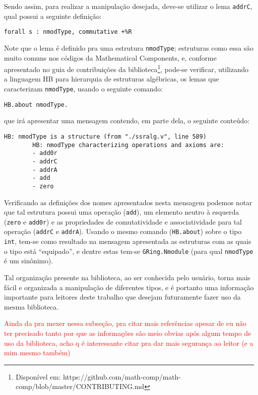 Sendo assim, para realizar a manipulação desejada, deve-se utilizar o lema \lstinline[language = coq]!addrC!, qual possui a seguinte definição: 
\begin{lstlisting}[language=coq]
        forall s : nmodType, commutative +%R
\end{lstlisting}
Note que o lema é definido pra uma estrutura \lstinline[language = coq]!nmodType!; estruturas como essa são muito comuns nos códigos da Mathematical Components, e, conforme apresentado no guia de contribuições da biblioteca\footnote{Disponível em: https://github.com/math-comp/math-comp/blob/master/CONTRIBUTING.md}, pode-se verificar, utilizando a linguagem HB \cite{cohen_et_al:LIPIcs.FSCD.2020.34} para hierarquia de estruturas algébricas, os lemas que caracterizam \lstinline[language = coq]!nmodType!, usando o seguinte comando: 
\begin{lstlisting}[language=coq]
        HB.about nmodType.
\end{lstlisting}
que irá apresentar uma mensagem contendo, em parte dela, o seguinte conteúdo:
\begin{lstlisting}[language=coq-error]
        HB: nmodType is a structure (from "./ssralg.v", line 589)
        HB: nmodType characterizing operations and axioms are:
        - add0r
        - addrC
        - addrA
        - add
        - zero
\end{lstlisting}
Verificando as definições dos nomes apresentados nesta mensagem podemos notar que tal estrutura possui uma operação (\lstinline[language = coq]!add!), um elemento neutro à esquerda (\lstinline[language = coq]!zero! e \lstinline[language = coq]!add0r!) e as propriedades de comutatividade e associatividade para tal operação (\lstinline[language = coq]!addrC! e \lstinline[language = coq]!addrA!).
Usando o mesmo comando (\lstinline[language = coq]!HB.about!) sobre o tipo \lstinline[language = coq]!int!, tem-se como resultado na mensagem apresentada as estruturas com as quais o tipo está ``equipado'', e dentre estas tem-se \lstinline[language = coq]!GRing.Nmodule! (para qual \lstinline[language=coq]!nmodType! é um sinônimo). 

Tal organização presente na biblioteca, ao ser conhecida pelo usuário, torna mais fácil e organizada a manipulação de diferentes tipos, e é portanto uma informação importante para leitores deste trabalho que desejam futuramente fazer uso da mesma biblioteca. 

\textcolor{red}{ Ainda da pra mexer nessa subseção, pra citar mais referências apesar de eu não ter precisado tanto por que as informações são meio obvias após algum tempo de uso da biblioteca, acho q é interessante citar pra dar mais segurança ao leitor (e a mim mesmo também)}

